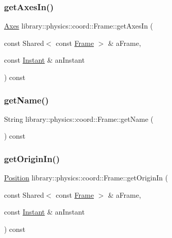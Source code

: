 \mbox{\label{classlibrary_1_1physics_1_1coord_1_1_frame_abd6fc9109e37433d4b223cfb291edb20}} 
\subsubsection{\texorpdfstring{get\+Axes\+In()}{getAxesIn()}}
{\footnotesize\ttfamily \hyperlink{classlibrary_1_1physics_1_1coord_1_1_axes}{Axes} library\+::physics\+::coord\+::\+Frame\+::get\+Axes\+In (\begin{DoxyParamCaption}\item[{const Shared$<$ const \hyperlink{classlibrary_1_1physics_1_1coord_1_1_frame}{Frame} $>$ \&}]{a\+Frame,  }\item[{const \hyperlink{classlibrary_1_1physics_1_1time_1_1_instant}{Instant} \&}]{an\+Instant }\end{DoxyParamCaption}) const}

\mbox{\label{classlibrary_1_1physics_1_1coord_1_1_frame_afec582db83d2bf93b2b070f8557ee760}} 
\subsubsection{\texorpdfstring{get\+Name()}{getName()}}
{\footnotesize\ttfamily String library\+::physics\+::coord\+::\+Frame\+::get\+Name (\begin{DoxyParamCaption}{ }\end{DoxyParamCaption}) const}

\mbox{\label{classlibrary_1_1physics_1_1coord_1_1_frame_aa68223b40939d6dd45ace7746805d33c}} 
\subsubsection{\texorpdfstring{get\+Origin\+In()}{getOriginIn()}}
{\footnotesize\ttfamily \hyperlink{classlibrary_1_1physics_1_1coord_1_1_position}{Position} library\+::physics\+::coord\+::\+Frame\+::get\+Origin\+In (\begin{DoxyParamCaption}\item[{const Shared$<$ const \hyperlink{classlibrary_1_1physics_1_1coord_1_1_frame}{Frame} $>$ \&}]{a\+Frame,  }\item[{const \hyperlink{classlibrary_1_1physics_1_1time_1_1_instant}{Instant} \&}]{an\+Instant }\end{DoxyParamCaption}) const}

